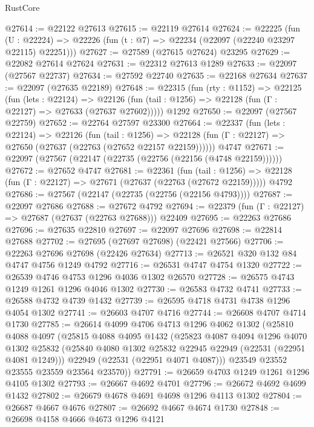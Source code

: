 \begin{lexlean}{RustCore}
\begin{coremodule}
@27614 := @22122 @27613
@27615 := @22119 @27614
@27624 := @22225
    (fun (U : @22224) => @22226 (fun (t : @7) => @22234 (@22097 (@22240 @23297 @22115) @22251)))
@27627 := @27589 (@27615 @27624) @23295
@27629 := @22082 @27614 @27624
@27631 := @22312 @27613 @1289
@27633 := @22097 (@27567 @22737)
@27634 := @27592 @22740
@27635 := @22168 @27634
@27637 := @22097 (@27635 @22189)
@27648 := @22315
    (fun (rty : @1152) =>
    @22125
      (fun (lets : @22124) =>
      @22126 (fun (tail : @1256) => @22128 (fun (Γ : @22127) => @27633 (@27637 @27602)))))
    @1292
@27650 := @22097 (@27567 @22759)
@27652 := @22764 @27597 @23300
@27664 := @22337
    (fun (lets : @22124) =>
    @22126
      (fun (tail : @1256) =>
      @22128 (fun (Γ : @22127) => @27650 (@27637 (@22763 (@27652 @22157 @22159))))))
    @4747
@27671 := @22097 (@27567 (@22147 (@22735 (@22756 (@22156 (@4748 @22159))))))
@27672 := @27652 @4747
@27681 := @22361
    (fun (tail : @1256) => @22128 (fun (Γ : @22127) => @27671 (@27637 (@22763 (@27672 @22159)))))
    @4792
@27686 := @27567 (@22147 (@22735 (@22756 (@22156 @4793))))
@27687 := @22097 @27686
@27688 := @27672 @4792
@27694 := @22379 (fun (Γ : @22127) => @27687 (@27637 (@22763 @27688))) @22409
@27695 := @22263 @27686
@27696 := @27635 @22810
@27697 := @22097 @27696
@27698 := @22814 @27688
@27702 := @27695 (@27697 @27698) (@22421 @27566)
@27706 := @22263 @27696 @27698 (@22426 @27634)
@27713 := @26521 @320 @132 @84 @4747 @4756 @1249 @4792
@27716 := @26531 @4747 @4754 @1320
@27722 := @26539 @4746 @4753 @1296 @4036 @1302 @26570
@27728 := @26575 @4743 @1249 @1261 @1296 @4046 @1302
@27730 := @26583 @4732 @4741
@27733 := @26588 @4732 @4739 @1432
@27739 := @26595 @4718 @4731 @4738 @1296 @4054 @1302
@27741 := @26603 @4707 @4716
@27744 := @26608 @4707 @4714 @1730
@27785 := @26614
    @4099
    @4706
    @4713
    @1296
    @4062
    @1302
    (@25810
      @4088
      @4097
      (@25815
        @4088
        @4095
        @1432
        (@25823
          @4087
          @4094
          @1296
          @4070
          @1302
          @25832
          (@25840 @4080 @1302 @25832 @22945 @22949 (@22531 (@22951 @4081 @1249)))
          @22949
          (@22531 (@22951 @4071 @4087)))
        @23549
        @23552
        @23555
        @23559
        @23564
        @23570))
@27791 := @26659 @4703 @1249 @1261 @1296 @4105 @1302
@27793 := @26667 @4692 @4701
@27796 := @26672 @4692 @4699 @1432
@27802 := @26679 @4678 @4691 @4698 @1296 @4113 @1302
@27804 := @26687 @4667 @4676
@27807 := @26692 @4667 @4674 @1730
@27848 := @26698
    @4158
    @4666
    @4673
    @1296
    @4121

\end{coremodule}
\end{lexlean}
